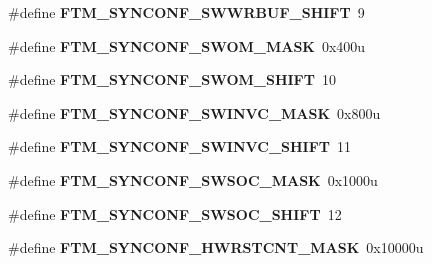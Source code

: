 \begin{DoxyCompactItemize}
\item 
\hypertarget{group___f_t_m___register___masks_ga7e637f85f9c1208956b53b41549e7d87}{}\#define {\bfseries F\+T\+M\+\_\+\+S\+Y\+N\+C\+O\+N\+F\+\_\+\+S\+W\+W\+R\+B\+U\+F\+\_\+\+S\+H\+I\+F\+T}~9\label{group___f_t_m___register___masks_ga7e637f85f9c1208956b53b41549e7d87}

\item 
\hypertarget{group___f_t_m___register___masks_ga83a5f269c2d4504f783db9f73465447c}{}\#define {\bfseries F\+T\+M\+\_\+\+S\+Y\+N\+C\+O\+N\+F\+\_\+\+S\+W\+O\+M\+\_\+\+M\+A\+S\+K}~0x400u\label{group___f_t_m___register___masks_ga83a5f269c2d4504f783db9f73465447c}

\item 
\hypertarget{group___f_t_m___register___masks_ga2e240c4c97396948369a13ec27c0f038}{}\#define {\bfseries F\+T\+M\+\_\+\+S\+Y\+N\+C\+O\+N\+F\+\_\+\+S\+W\+O\+M\+\_\+\+S\+H\+I\+F\+T}~10\label{group___f_t_m___register___masks_ga2e240c4c97396948369a13ec27c0f038}

\item 
\hypertarget{group___f_t_m___register___masks_ga6b91d1ec9cfd8e992734eab0b764fa50}{}\#define {\bfseries F\+T\+M\+\_\+\+S\+Y\+N\+C\+O\+N\+F\+\_\+\+S\+W\+I\+N\+V\+C\+\_\+\+M\+A\+S\+K}~0x800u\label{group___f_t_m___register___masks_ga6b91d1ec9cfd8e992734eab0b764fa50}

\item 
\hypertarget{group___f_t_m___register___masks_ga1b9db3f75907123978450cf63605621b}{}\#define {\bfseries F\+T\+M\+\_\+\+S\+Y\+N\+C\+O\+N\+F\+\_\+\+S\+W\+I\+N\+V\+C\+\_\+\+S\+H\+I\+F\+T}~11\label{group___f_t_m___register___masks_ga1b9db3f75907123978450cf63605621b}

\item 
\hypertarget{group___f_t_m___register___masks_ga33a4f7326defaab9414315649e467ff5}{}\#define {\bfseries F\+T\+M\+\_\+\+S\+Y\+N\+C\+O\+N\+F\+\_\+\+S\+W\+S\+O\+C\+\_\+\+M\+A\+S\+K}~0x1000u\label{group___f_t_m___register___masks_ga33a4f7326defaab9414315649e467ff5}

\item 
\hypertarget{group___f_t_m___register___masks_gaabae406b076dd71660d85bef42d47fb1}{}\#define {\bfseries F\+T\+M\+\_\+\+S\+Y\+N\+C\+O\+N\+F\+\_\+\+S\+W\+S\+O\+C\+\_\+\+S\+H\+I\+F\+T}~12\label{group___f_t_m___register___masks_gaabae406b076dd71660d85bef42d47fb1}

\item 
\hypertarget{group___f_t_m___register___masks_gaea9636cc8049be6d3d952dc343d34185}{}\#define {\bfseries F\+T\+M\+\_\+\+S\+Y\+N\+C\+O\+N\+F\+\_\+\+H\+W\+R\+S\+T\+C\+N\+T\+\_\+\+M\+A\+S\+K}~0x10000u\label{group___f_t_m___register___masks_gaea9636cc8049be6d3d952dc343d34185}


\end{DoxyCompactItemize}

